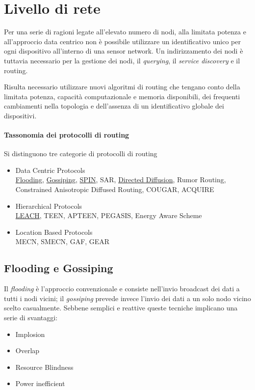 \section{Livello di rete}

	Per una serie di ragioni legate all'elevato numero di nodi, alla limitata potenza e all'approccio data centrico non è possibile utilizzare un identificativo unico per ogni dispositivo all'interno di una sensor network.
	Un indirizzamento dei nodi è tuttavia necessario per la gestione dei nodi, il \emph{querying}, il \emph{service discovery} e il routing.
	
	Risulta necessario utilizzare nuovi algoritmi di routing che tengano conto della limitata potenza, capacità computazionale e memoria disponibili, dei frequenti cambiamenti nella topologia e dell'assenza di un identificativo globale dei dispositivi.
	
\paragraph{Tassonomia dei protocolli di routing}

	Si distinguono tre categorie di protocolli di routing
	\begin{itemize}
		\item Data Centric Protocols\\
			\underline{Flooding}, \underline{Gossiping}, \underline{SPIN}, SAR, \underline{Directed Diffusion}, Rumor Routing, Constrained Anisotropic Diffused Routing, COUGAR, ACQUIRE
		
		\item Hierarchical Protocols\\
			\underline{LEACH}, TEEN, APTEEN, PEGASIS, Energy Aware Scheme
		
		\item Location Based Protocols\\
			MECN, SMECN, GAF, GEAR
	\end{itemize}

\subsection{Flooding e Gossiping}

	Il \emph{flooding} è l'approccio convenzionale e consiste nell'invio broadcast dei dati a tutti i nodi vicini;
	il \emph{gossiping} prevede invece l'invio dei dati a un solo nodo vicino scelto casualmente.
	Sebbene semplici e reattive queste tecniche implicano una serie di svantaggi:
	\begin{itemize}
		\item Implosion
		\item Overlap
		\item Resource Blindness
		\item Power inefficient
	\end{itemize}

